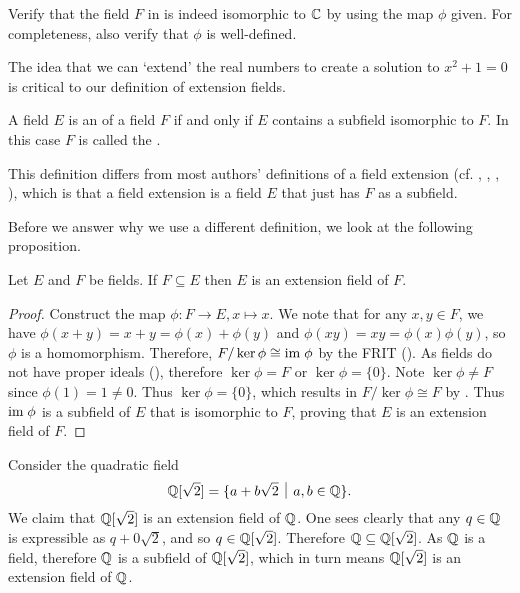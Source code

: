\begin{exercise}
    Verify that the field $F$ in  is indeed isomorphic to $\mathbb{C}$ by using the map $\phi$ given. For completeness, also verify that $\phi$ is well-defined.
\end{exercise}

The idea that we can `extend' the real numbers to create a solution to $x^2 + 1 = 0$ is critical to our definition of extension fields.

\begin{definition}
    A field $E$ is an  of a field $F$ if and only if $E$ contains a subfield isomorphic to $F$. In this case $F$ is called the .
\end{definition}
\begin{remark}
    This definition differs from most authors' definitions of a field extension (cf. \cite[p.~511]{dummit_foote_2004}, \cite[p.~442]{artin_2011}, \cite[p.~338]{gallian_2016}, \cite[p.~260]{judson_beezer_2022}), which is that a field extension is a field $E$ that just has $F$ as a subfield.
\end{remark}

Before we answer why we use a different definition, we look at the following proposition.

\begin{proposition}
    Let $E$ and $F$ be fields. If $F \subseteq E$ then $E$ is an extension field of $F$.
\end{proposition}
\begin{proof}
    Construct the map $\phi: F \to E, x \mapsto x$. We note that for any $x,y\in F$, we have $\phi(x + y) = x + y = \phi(x) + \phi(y)$ and $\phi(xy) = xy = \phi(x)\phi(y)$, so $\phi$ is a homomorphism. Therefore, $F/\ker\phi \cong \mathrm{im}\;\phi$ by the FRIT (). As fields do not have proper ideals (), therefore $\ker\phi = F$ or $\ker\phi = \{0\}$. Note $\ker\phi \neq F$ since $\phi(1) = 1 \neq 0$. Thus $\ker\phi = \{0\}$, which results in $F/\ker\phi \cong F$ by . Thus $\mathrm{im}\;\phi$ is a subfield of $E$ that is isomorphic to $F$, proving that $E$ is an extension field of $F$.
\end{proof}

\begin{example}
    Consider the quadratic field
    \[
        \Q[\sqrt{2}] = \{a + b\sqrt{2} \vert a,b\in\Q\}.
    \]
    We claim that $\mathbb{Q}[\sqrt{2}]$ is an extension field of $\mathbb{Q}$. One sees clearly that any $q \in \mathbb{Q}$ is expressible as $q + 0\sqrt{2}$, and so $q \in \mathbb{Q}[\sqrt2]$. Therefore $\mathbb{Q} \subseteq \mathbb{Q}[\sqrt2]$. As $\mathbb{Q}$ is a field, therefore $\mathbb{Q}$ is a subfield of $\mathbb{Q}[\sqrt2]$, which in turn means $\mathbb{Q}[\sqrt2]$ is an extension field of $\mathbb{Q}$.
\end{example}

